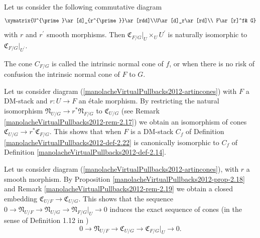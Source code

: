 \begin{lemma}\label{manolacheVirtualPullbacks2012-lem-2.21}
 Let us consider the following commutative diagram
\begin{equation*}
 \xymatrix {U^{\prime}\ar[d]_{r^{\prime}}\ar[rdd]\\U\ar[d]_r\ar[rd]\\
             F\ar[r]^f& G}
\end{equation*}
with $r$ and $r^{\prime}$ smooth morphisms. Then $\mathfrak{C}_{F/G}|_U\times_UU^{\prime}$ is naturally isomorphic to $\mathfrak{C}_{F/G}|_{U^{\prime}}$.
\end{lemma}

\begin{definition}\label{manolacheVirtualPullbacks2012-def-2.22}
\label{manolacheVirtualPullbacks2012-coneartinstack}
The cone $C_{F/G}$ is called the intrinsic normal cone of $f$, or when there is no risk of confusion the intrinsic normal cone of $F$ to $G$.
\end{definition}

\begin{remark}\label{manolacheVirtualPullbacks2012-rem-2.23}
Let us consider diagram (\ref{manolacheVirtualPullbacks2012-artincones}) with $F$ a DM-stack and $r:U\to F$ an \'etale morphism.  By restricting the natural isomorphism $\mathfrak{N}_{U/G}\to r^*\mathfrak{N}_{F/G}$ to $\mathfrak{C}_{U/G}$ (see Remark \ref{manolacheVirtualPullbacks2012-rem-2.17}) we obtain an isomorphism of cones $\mathfrak{C}_{U/G}\to r^*\mathfrak{C}_{F/G}$. This shows that when $F$ is a DM-stack $C_f$ of Definition \ref{manolacheVirtualPullbacks2012-def-2.22} is canonically isomorphic to $C_f$ of Definition \ref{manolacheVirtualPullbacks2012-def-2.14}.
\end{remark}

\begin{remark}\label{manolacheVirtualPullbacks2012-rem-2.24}
 Let us consider diagram (\ref{manolacheVirtualPullbacks2012-artincones}), with $r$ a smooth morphism. By Proposition \ref{manolacheVirtualPullbacks2012-prop-2.18} and Remark \ref{manolacheVirtualPullbacks2012-rem-2.19} we obtain a closed embedding $\mathfrak{C}_{U/F}\to\mathfrak{C}_{U/G}$. This shows that the sequence $0\to\mathfrak{N}_{U/F}\to\mathfrak{N}_{U/G}\to\mathfrak{N}_{F/G}|_U\to 0$ induces the exact sequence of cones (in the sense of Definition 1.12 in \cite{bf})
\begin{equation}\label{manolacheVirtualPullbacks2012-artco}
0\to\mathfrak{N}_{U/F}\to\mathfrak{C}_{U/G}\to\mathfrak{C}_{F/G}|_U\to 0.
\end{equation}
\end{remark}

